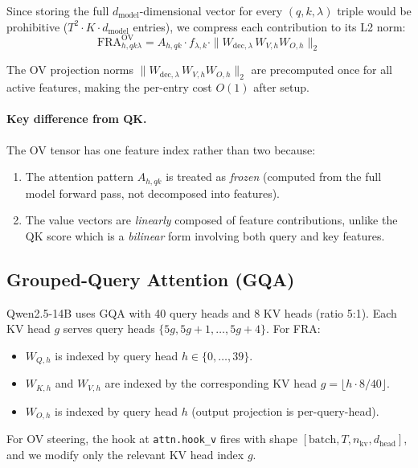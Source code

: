 \documentclass{article}
\theoremstyle{plain}
\theoremstyle{definition}
\theoremstyle{remark}
\newcommand{\dmodel}{d_{\mathrm{model}}}
\newcommand{\dhead}{d_{\mathrm{head}}}
\begin{document}
Since storing the full $\dmodel$-dimensional vector for every $(q,k,\lambda)$ triple would be prohibitive ($T^2 \cdot K \cdot \dmodel$ entries), we compress each contribution to its L2 norm:
\begin{equation}
    \mathrm{FRA}^{\mathrm{OV}}_{h,qk\lambda} = A_{h,qk} \cdot f_{\lambda,k} \cdot \|W_{\mathrm{dec},\lambda}\, W_{V,h} W_{O,h}\|_2
\end{equation}

The OV projection norms $\|W_{\mathrm{dec},\lambda}\, W_{V,h} W_{O,h}\|_2$ are precomputed once for all active features, making the per-entry cost $O(1)$ after setup.

\paragraph{Key difference from QK.} The OV tensor has one feature index rather than two because:
\begin{enumerate}
    \item The attention pattern $A_{h,qk}$ is treated as \emph{frozen} (computed from the full model forward pass, not decomposed into features).
    \item The value vectors are \emph{linearly} composed of feature contributions, unlike the QK score which is a \emph{bilinear} form involving both query and key features.
\end{enumerate}

\subsection{Grouped-Query Attention (GQA)}
\label{app:gqa}

Qwen2.5-14B uses GQA with 40 query heads and 8 KV heads (ratio 5:1). Each KV head $g$ serves query heads $\{5g, 5g+1, \ldots, 5g+4\}$. For FRA:
\begin{itemize}
    \item $W_{Q,h}$ is indexed by query head $h \in \{0, \ldots, 39\}$.
    \item $W_{K,h}$ and $W_{V,h}$ are indexed by the corresponding KV head $g = \lfloor h \cdot 8 / 40 \rfloor$.
    \item $W_{O,h}$ is indexed by query head $h$ (output projection is per-query-head).
\end{itemize}
For OV steering, the hook at \texttt{attn.hook\_v} fires with shape $[\text{batch}, T, n_{\mathrm{kv}}, \dhead]$, and we modify only the relevant KV head index $g$.
\end{document}
